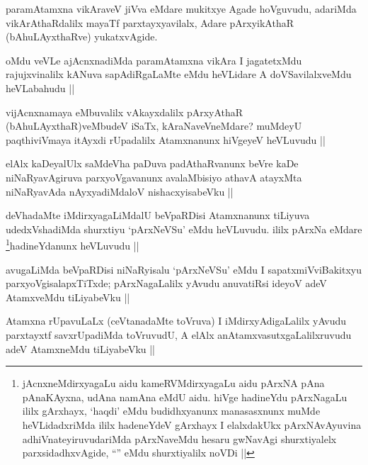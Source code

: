 \begin{artha}
paramAtamxna vikAraveV jiVva eMdare mukitxye Agade hoVguvudu, adariMda vikArAthaRdalilx mayaTf parxtayxyavilalx, Adare pArxyikAthaR (bAhuLAyxthaRve) yukatxvAgide.
\end{artha}

\begin{artha}
oMdu veVLe ajAcnxnadiMda paramAtamxna vikAra I jagatetxMdu rajujxvinalilx kANuva sapAdiRgaLaMte eMdu heVLidare A doVSavilalxveMdu heVLabahudu ||
\end{artha}

\begin{artha}
vijAcnxnamaya eMbuvalilx vAkayxdalilx pArxyAthaR (bAhuLAyxthaR)veMbudeV iSaTx, kAraNaveVneMdare? muMdeyU paqthiviVmaya itAyxdi rUpadalilx Atamxnanunx hiVgeyeV heVLuvudu ||
\end{artha}

\begin{artha}
elAlx kaDeyalUlx saMdeVha paDuva padAthaRvanunx beVre kaDe niNaRyavAgiruva parxyoVgavanunx avalaMbisiyo athavA atayxMta niNaRyavAda nAyxyadiMdaloV nishacxyisabeVku ||
\end{artha}

\begin{artha}
deVhadaMte iMdirxyagaLiMdalU beVpaRDisi Atamxnanunx tiLiyuva udedxVshadiMda shurxtiyu `pArxNeVSu' eMdu heVLuvudu. ililx pArxNa eMdare \footnote{jAcnxneMdirxyagaLu aidu kameRVMdirxyagaLu aidu pArxNA pAna pAnaKAyxna, udAna namAna eMdU aidu. hiVge hadineYdu pArxNagaLu ililx gArxhayx, `haqdi' eMdu budidhxyanunx manasasxnunx muMde heVLidadxriMda ililx hadeneYdeV gArxhayx I elalxdakUkx pArxNAvAyuvina adhiVnateyiruvudariMda pArxNaveMdu hesaru gwNavAgi shurxtiyalelx parxsidadhxvAgide, ``\stext'' eMdu shurxtiyalilx noVDi ||}hadineYdanunx heVLuvudu ||
\end{artha}

\begin{artha}
avugaLiMda beVpaRDisi niNaRyisalu `pArxNeVSu' eMdu I sapatxmiVviBakitxyu parxyoVgisalapxTiTxde; pArxNagaLalilx yAvudu anuvatiRsi ideyoV adeV AtamxveMdu tiLiyabeVku ||
\end{artha}

\begin{artha}
Atamxna rUpavuLaLx (ceVtanadaMte toVruva) I iMdirxyAdigaLalilx yAvudu parxtayxtf savxrUpadiMda toVruvudU, A elAlx anAtamxvasutxgaLalilxruvudu adeV AtamxneMdu tiLiyabeVku ||
\end{artha}

